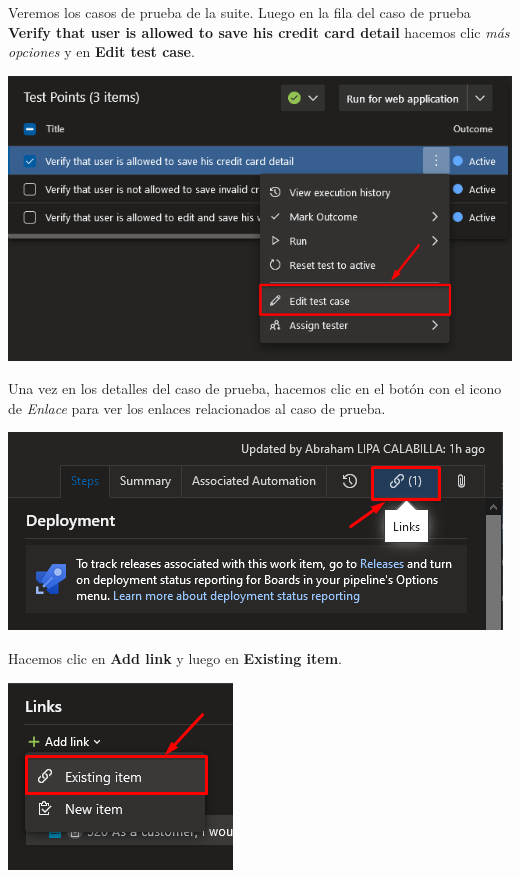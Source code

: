 \documentclass{elsarticle}
\begin{document}
Veremos los casos de prueba de la suite. Luego en la fila del caso de prueba \textbf{Verify that user is allowed to save his credit card detail} hacemos clic \textit{más opciones} y en \textbf{Edit test case}.
\begin{center}
	\includegraphics[width=\columnwidth]{img/Screenshot_20.png}
\end{center}

Una vez en los detalles del caso de prueba, hacemos clic en el botón con el icono de \textit{Enlace} para ver los enlaces relacionados al caso de prueba.
\begin{center}
	\includegraphics[width=\columnwidth]{img/Screenshot_21.png}
\end{center}

Hacemos clic en \textbf{Add link} y luego en \textbf{Existing item}.
\begin{center}
	\includegraphics{img/Screenshot_22.png}
\end{center}
\end{document}
